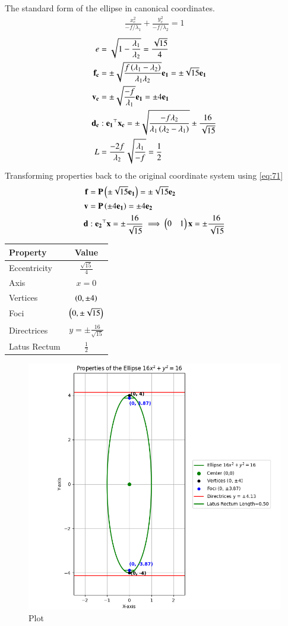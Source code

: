 \documentclass[journal]{IEEEtran}
\begin{document}
The standard form of the ellipse in canonical coordinates.
\begin{align}
    \frac{x_c^2}{-f/\lambda_1} + \frac{y_c^2}{-f/\lambda_2} = 1
\end{align}
\begin{align}
    e &= \sqrt{1 - \frac{\lambda_1}{\lambda_2}} = \frac{\sqrt{15}}{4} \\
    \mathbf{f_c} &= \pm\sqrt{\frac{f\left(\lambda_1 - \lambda_2\right)}{\lambda_1\lambda_2}}\mathbf{e_1} = \pm\sqrt{15}\mathbf{e_1} \\
    \mathbf{v_c} &= \pm\sqrt{\frac{-f}{\lambda_1}}\mathbf{e_1} = \pm 4\mathbf{e_1} \\
    \mathbf{d_c} &: \mathbf{e_1}^\top\mathbf{x_c} = \pm\sqrt{\frac{-f\lambda_2}{\lambda_1\left(\lambda_2-\lambda_1\right)}} \pm\frac{16}{\sqrt{15}} \\
    L &= \frac{-2f}{\lambda_2}\sqrt{\frac{\lambda_1}{-f}} = \frac{1}{2}
\end{align}
Transforming properties back to the original coordinate system using \eqref{eq:71}
\begin{align}
    \mathbf{f} &= \mathbf{P}\left(\pm \sqrt{15}\mathbf{e_1}\right) = \pm \sqrt{15}\mathbf{e_2} \\
    \mathbf{v} &= \mathbf{P}\left(\pm 4\mathbf{e_1}\right) = \pm 4\mathbf{e_2} \\
    \mathbf{d} &: \mathbf{e_2}^\top\mathbf{x} = \pm \frac{16}{\sqrt{15}} \implies \begin{pmatrix}0 & 1\end{pmatrix}\mathbf{x} = \pm \frac{16}{\sqrt{15}}
\end{align}
\begin{center}
\begin{tabular}{|l|c|}
    \hline
    \textbf{Property} & \textbf{Value} \\
    \hline
    Eccentricity & $\frac{\sqrt{15}}{4}$ \\
    \hline
    Axis & $x=0$ \\
    \hline
    Vertices & $\left(0, \pm 4\right)$ \\
    \hline
    Foci & $\left(0, \pm \sqrt{15}\right)$ \\
    \hline
    Directrices & $y = \pm \frac{16}{\sqrt{15}}$ \\
    \hline
    Latus Rectum & $\frac{1}{2}$ \\
    \hline
\end{tabular}
\end{center}






\begin{figure}[H]
	\centering
	\includegraphics[width=0.8\columnwidth]{figs/fig1.png}
	\caption*{Plot}
	\label{fig:1}
\end{figure}
\end{document}
